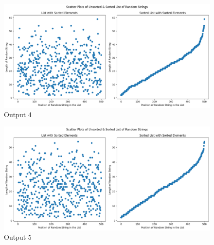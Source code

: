 \documentclass[UTF8, letter]{article}
\begin{document}
\vspace{5mm}
\begin{figure}[hbt!]
	\centering
	\includegraphics[width=\linewidth]{output_4.png}
	\caption{Output 4}
	\label{fig:Output4}
\end{figure}

\vspace{5mm}
\begin{figure}[hbt!]
	\centering
	\includegraphics[width=\linewidth]{output_5.png}
	\caption{Output 5}
	\label{fig:Output5}
\end{figure}


	
\end{document}
